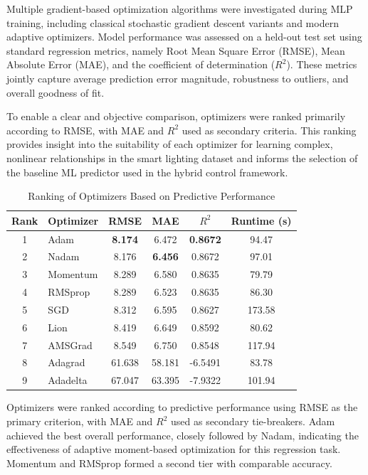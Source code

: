 \documentclass[conference]{IEEEtran}
\begin{document}
Multiple gradient-based optimization algorithms were investigated during MLP training, including classical stochastic gradient descent variants and modern adaptive optimizers. Model performance was assessed on a held-out test set using standard regression metrics, namely Root Mean Square Error (RMSE), Mean Absolute Error (MAE), and the coefficient of determination ($R^2$). These metrics jointly capture average prediction error magnitude, robustness to outliers, and overall goodness of fit.

To enable a clear and objective comparison, optimizers were ranked primarily according to RMSE, with MAE and $R^2$ used as secondary criteria. This ranking provides insight into the suitability of each optimizer for learning complex, nonlinear relationships in the smart lighting dataset and informs the selection of the baseline ML predictor used in the hybrid control framework.

\begin{table}[H]
\centering
\caption{Ranking of Optimizers Based on Predictive Performance}
\label{tab:optimizer_ranking}
    \begin{tabular}{c|l|c|c|c|c}
        \hline
        \textbf{Rank} & \textbf{Optimizer} & \textbf{RMSE} & \textbf{MAE} & \textbf{$R^2$} & \textbf{Runtime (s)} \\
        \hline
        1 & Adam      & \textbf{8.174} & 6.472 & \textbf{0.8672} & 94.47 \\
        2 & Nadam     & 8.176 & \textbf{6.456} & 0.8672 & 97.01 \\
        3 & Momentum  & 8.289 & 6.580 & 0.8635 & 79.79 \\
        4 & RMSprop   & 8.289 & 6.523 & 0.8635 & 86.30 \\
        5 & SGD       & 8.312 & 6.595 & 0.8627 & 173.58 \\
        6 & Lion      & 8.419 & 6.649 & 0.8592 & 80.62 \\
        7 & AMSGrad   & 8.549 & 6.750 & 0.8548 & 117.94 \\
        8 & Adagrad   & 61.638 & 58.181 & -6.5491 & 83.78 \\
        9 & Adadelta  & 67.047 & 63.395 & -7.9322 & 101.94 \\
        \hline
    \end{tabular}
\end{table}

Optimizers were ranked according to predictive performance using RMSE as the primary criterion, 
with MAE and $R^2$ used as secondary tie-breakers. Adam achieved the best overall performance, 
closely followed by Nadam, indicating the effectiveness of adaptive moment-based optimization 
for this regression task. Momentum and RMSprop formed a second tier with comparable accuracy.
\end{document}
